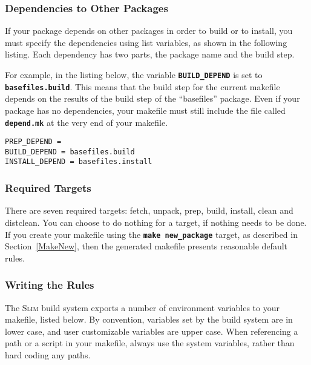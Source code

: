 \documentclass[a4paper,10pt]{article}
\newcommand{\slim}{\textsc{Slim}\xspace}
\newcommand{\fw}{\tt\bf}
\begin{document}
\subsubsection{Dependencies to Other Packages}

    If your package depends on other packages in order to build or to
    install, you must specify the dependencies using list variables,
    as shown in the following listing. Each dependency has two parts,
    the package name and the build step.

    For example, in the listing below, the variable {\fw BUILD\_DEPEND}
    is set to {\fw basefiles.build}. This means that the build step
    for the current makefile depends on the results of the build step
    of the ``basefiles'' package. Even if your package has no
    dependencies, your makefile must still include the file called
    {\fw depend.mk} at the very end of your makefile.

\begin{lstlisting}
PREP_DEPEND =
BUILD_DEPEND = basefiles.build
INSTALL_DEPEND = basefiles.install
\end{lstlisting}

\subsubsection{Required Targets} \label{RequiredTargets}

    There are seven required targets: fetch, unpack, prep, build,
    install, clean and distclean. You can choose to do nothing for a
    target, if nothing needs to be done. If you create your makefile
    using the {\fw make new\_package} target, as described in
    Section~\ref{MakeNew}, then the generated makefile presents
    reasonable default rules.

\subsubsection{Writing the Rules}

    The \slim build system exports a number of environment variables
    to your makefile, listed below. By convention, variables set by
    the build system are in lower case, and user customizable
    variables are upper case. When referencing a path or a script in
    your makefile, always use the system variables, rather than hard
    coding any paths.
\end{document}
